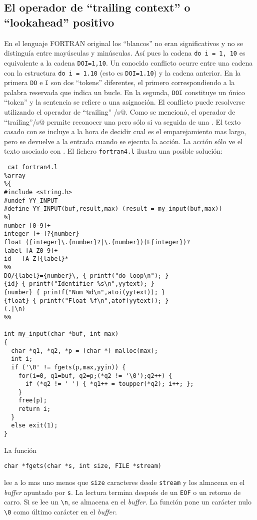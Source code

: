 \subsection{El operador de ``trailing context'' o ``lookahead'' positivo}
En el lenguaje FORTRAN original los ``blancos'' no eran significativos
y no se distinguía entre mayúsculas y minúsculas.
Así pues la cadena \verb|do i = 1, 10| es equivalente a la cadena
\verb|DOI=1,10|. Un conocido conflicto ocurre entre una cadena 
con la estructura \verb|do i = 1.10| (esto es \verb|DOI=1.10|) y  
la cadena anterior. En la primera \verb|DO| e \verb|I| son dos
``tokens'' diferentes, el primero correspondiendo a la palabra reservada que indica un bucle. En la segunda, \verb|DOI| constituye un único ``token''
y la sentencia se refiere a una asignación.
El conflicto puede resolverse utilizando el operador de ``trailing'' \verb@r/s@. 
Como se mencionó, el operador de ``trailing''\verb@r/s@ permite reconocer una \verb@r@ pero s\'olo si va seguida de una \verb@s@. El texto casado con \verb@s@ se incluye a la hora de decidir cual es el emparejamiento mas largo, pero se devuelve a la entrada cuando se ejecuta la acci\'on. La acci\'on s\'olo ve el texto asociado con \verb@r@.  El fichero \verb|fortran4.l| ilustra una posible solución:
\begin{verbatim}
 cat fortran4.l
%array
%{
#include <string.h>
#undef YY_INPUT
#define YY_INPUT(buf,result,max) (result = my_input(buf,max))
%}
number [0-9]+
integer [+-]?{number}
float ({integer}\.{number}?|\.{number})(E{integer})?
label [A-Z0-9]+
id   [A-Z]{label}*
%%
DO/{label}={number}\, { printf("do loop\n"); }
{id} { printf("Identifier %s\n",yytext); }
{number} { printf("Num %d\n",atoi(yytext)); }
{float} { printf("Float %f\n",atof(yytext)); }
(.|\n)
%%

int my_input(char *buf, int max)
{
  char *q1, *q2, *p = (char *) malloc(max);
  int i;
  if ('\0' != fgets(p,max,yyin)) {
    for(i=0, q1=buf, q2=p;(*q2 != '\0');q2++) {
      if (*q2 != ' ') { *q1++ = toupper(*q2); i++; };
    }
    free(p);
    return i;
  }
  else exit(1);
}
\end{verbatim}
La función 

\verb|char *fgets(char *s, int size, FILE *stream)| 

lee a lo mas uno menos que \verb|size| caracteres desde \verb|stream| y los almacena en el \emph{buffer}
apuntado por \verb|s|. La lectura termina después de un  \verb|EOF| o un retorno de carro.
Si se lee un \verb|\n|, se almacena en el \emph{buffer}. La función pone un carácter nulo \verb|\0| 
como último carácter en el \emph{buffer}.

